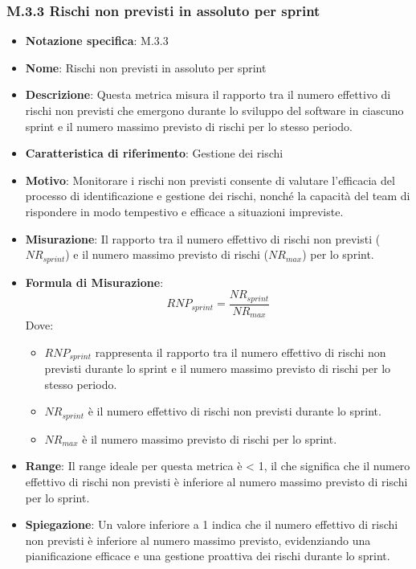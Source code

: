 \subsubsection{M.3.3 Rischi non previsti in assoluto per sprint}
\begin{itemize}
    \item \textbf{Notazione specifica}: M.3.3
    \item \textbf{Nome}: Rischi non previsti in assoluto per sprint
    \item \textbf{Descrizione}: Questa metrica misura il rapporto tra il numero effettivo di rischi non previsti che emergono durante lo sviluppo del software in ciascuno sprint e il numero massimo previsto di rischi per lo stesso periodo.
    \item \textbf{Caratteristica di riferimento}: Gestione dei rischi
    \item \textbf{Motivo}: Monitorare i rischi non previsti consente di valutare l'efficacia del processo di identificazione e gestione dei rischi, nonché la capacità del team di rispondere in modo tempestivo e efficace a situazioni impreviste.
    \item \textbf{Misurazione}: Il rapporto tra il numero effettivo di rischi non previsti (\(NR_{sprint}\)) e il numero massimo previsto di rischi (\(NR_{max}\)) per lo sprint.
    \item \textbf{Formula di Misurazione}:
    \[
    RNP_{sprint} = \frac{NR_{sprint}}{NR_{max}}
    \]
    Dove:
    \begin{itemize}
        \item \(RNP_{sprint}\) rappresenta il rapporto tra il numero effettivo di rischi non previsti durante lo sprint e il numero massimo previsto di rischi per lo stesso periodo.
        \item \(NR_{sprint}\) è il numero effettivo di rischi non previsti durante lo sprint.
        \item \(NR_{max}\) è il numero massimo previsto di rischi per lo sprint.
    \end{itemize}
    \item \textbf{Range}: Il range ideale per questa metrica è < 1, il che significa che il numero effettivo di rischi non previsti è inferiore al numero massimo previsto di rischi per lo sprint.
    \item \textbf{Spiegazione}: Un valore inferiore a 1 indica che il numero effettivo di rischi non previsti è inferiore al numero massimo previsto, evidenziando una pianificazione efficace e una gestione proattiva dei rischi durante lo sprint.
\end{itemize}
